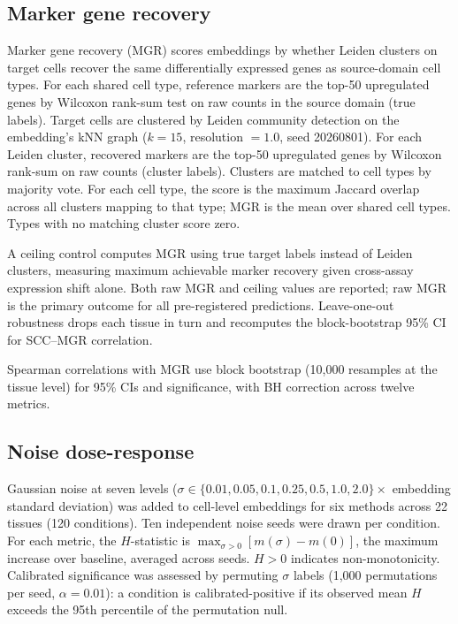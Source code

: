 \documentclass[11pt]{article}
\begin{document}
\subsection{Marker gene recovery}
\label{sec:mgrmethod}

Marker gene recovery (MGR) scores embeddings by whether Leiden
clusters on target cells recover the same differentially expressed
genes as source-domain cell types. For each shared cell type,
reference markers are the top-50 upregulated genes by Wilcoxon
rank-sum test on raw counts in the source domain (true labels). Target
cells are clustered by Leiden community detection on the embedding's
kNN graph ($k = 15$, resolution $= 1.0$, seed 20260801). For each
Leiden cluster, recovered markers are the top-50 upregulated genes by
Wilcoxon rank-sum on raw counts (cluster labels). Clusters are matched
to cell types by majority vote. For each cell type, the score is the
maximum Jaccard overlap across all clusters mapping to that type; MGR
is the mean over shared cell types. Types with no matching cluster
score zero.

A ceiling control computes MGR using true target labels instead of
Leiden clusters, measuring maximum achievable marker recovery given
cross-assay expression shift alone. Both raw MGR and ceiling values
are reported; raw MGR is the primary outcome for all pre-registered
predictions. Leave-one-out robustness drops each tissue in turn and
recomputes the block-bootstrap 95\% CI for SCC--MGR correlation.

Spearman correlations with MGR use block bootstrap (10{,}000
resamples at the tissue level) for 95\% CIs and significance, with BH
correction across twelve metrics.

\subsection{Noise dose-response}
\label{sec:noisemethod}

Gaussian noise at seven levels ($\sigma \in \{0.01, 0.05, 0.1, 0.25,
0.5, 1.0, 2.0\} \times$ embedding standard deviation) was added to
cell-level embeddings for six methods across 22 tissues (120
conditions). Ten independent noise seeds were drawn per condition. For
each metric, the $H$-statistic is $\max_{\sigma > 0}[m(\sigma) -
m(0)]$, the maximum increase over baseline, averaged across seeds.
$H > 0$ indicates non-monotonicity. Calibrated significance
was assessed by permuting $\sigma$ labels (1{,}000 permutations per
seed, $\alpha = 0.01$): a condition is calibrated-positive if its
observed mean $H$ exceeds the 95th percentile of the permutation null.
\end{document}
